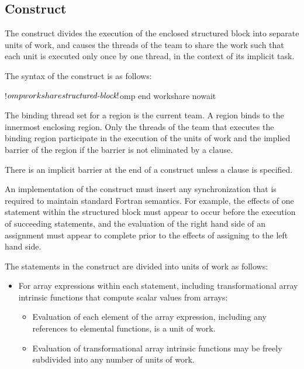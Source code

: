 \begin{fortranspecific}

\subsection{ Construct}
\label{subsec:workshare Construct}
\summary
The  construct divides the execution of the enclosed structured 
block into separate units of work, and causes the threads of the team to share 
the work such that each unit is executed only once by one thread, in the context 
of its implicit task.

\syntax
The syntax of the  construct is as follows:

\begin{ompfPragma}
!$omp workshare
    \plc{structured-block}
!$omp end workshare \plc{[}nowait\plc{]}
\end{ompfPragma}

\binding
The binding thread set for a  region is the current team. 
A  region binds to the innermost enclosing  
region. Only the threads of the team that executes the binding  
region participate in the execution of the units of work and the implied 
barrier of the  region if the barrier is not eliminated
by a  clause.

\descr
There is an implicit barrier at the end of a  construct 
unless a  clause is specified.

An implementation of the  construct must insert any synchronization 
that is required to maintain standard Fortran semantics. For example, the effects 
of one statement within the structured block must appear to occur before the 
execution of succeeding statements, and the evaluation of the right hand side of 
an assignment must appear to complete prior to the effects of assigning to the left 
hand side. 

The statements in the  construct are divided into units of work 
as follows:

\begin{itemize}
\item For array expressions within each statement, including transformational 
      array intrinsic functions that compute scalar values from arrays:

\begin{itemize}
\item Evaluation of each element of the array expression, including any 
      references to elemental functions, is a unit of work.
\item Evaluation of transformational array intrinsic functions may be freely
      subdivided into any number of units of work.
\end{itemize}


\end{itemize}
\end{fortranspecific}
